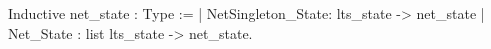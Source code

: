 Inductive net_state : Type :=
  | NetSingleton_State: lts_state      -> net_state
  | Net_State         : list lts_state -> net_state.